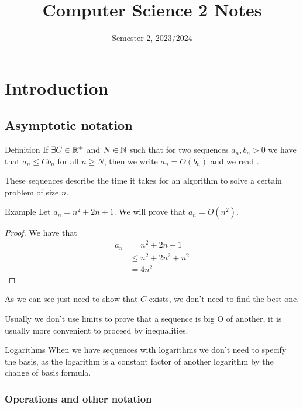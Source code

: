 \documentclass[12pt]{extarticle}
\title{Computer Science 2 Notes}
\date{Semester 2, 2023/2024}
\begin{document}
\maketitle
\tableofcontents
\clearpage

\section{Introduction}

\subsection{Asymptotic notation}

\begin{bluebox}{Definition}
    If $\exists C \in \mathbb{R}^+$ and $N \in \mathbb{N}$ such that for two sequences $a_n, b_n > 0$
    we have that $a_n \leq Cb_n$ for all $n \geq N$, then we write $a_n = O(b_n)$ and we read .
\end{bluebox}

These sequences describe the time it takes for an algorithm to solve a certain problem of size $n$.

\begin{examplebox}{Example}
    Let $a_n = n^2 + 2n + 1$. We will prove that $a_n = O(n^2)$.

    \begin{proof}
        We have that
        \begin{align*}
            a_n & = n^2 + 2n + 1        \\
                & \leq n^2 + 2n^2 + n^2 \\
                & = 4n^2
        \end{align*}
    \end{proof}

    As we can see just need to show that $C$ exists, we don't need to find the best one.
\end{examplebox}

Usually we don't use limits to prove that a sequence is big O of another, it is usually more convenient to proceed by inequalities.

\begin{notebox}{Logarithms}
    When we have sequences with logarithms we don't need to specify the basis,
    as the logarithm is a constant factor of another logarithm by the change of basis formula.
\end{notebox}

\subsubsection{Operations and other notation}
\end{document}

